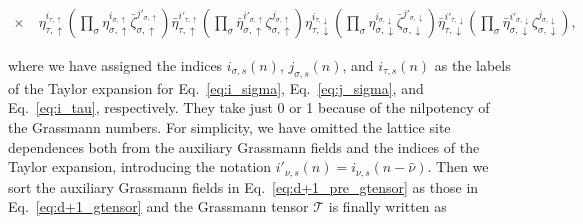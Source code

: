 \documentclass[nofootinbib,prd,aps,superscriptaddress,preprintnumbers,twocolumn,showpacs]{revtex4-1}
\begin{document}
\begin{widetext}
\begin{align}
	\times&~\eta_{\tau,\uparrow}^{i_{\tau,\uparrow}}\left(\prod_{\sigma}\eta_{\sigma,\uparrow}^{i_{\sigma,\uparrow}}\bar{\zeta}_{\sigma,\uparrow}^{j'_{\sigma,\uparrow}}\right)\bar{\eta}_{\tau,\uparrow}^{i'_{\tau,\uparrow}}\left(\prod_{\sigma}\bar{\eta}_{\sigma,\uparrow}^{i'_{\sigma,\uparrow}}\zeta_{\sigma,\uparrow}^{j_{\sigma,\uparrow}}\right)
	\eta_{\tau,\downarrow}^{i_{\tau,\downarrow}}\left(\prod_{\sigma}\eta_{\sigma,\downarrow}^{i_{\sigma,\downarrow}}\bar{\zeta}_{\sigma,\downarrow}^{j'_{\sigma,\downarrow}}\right)\bar{\eta}_{\tau,\downarrow}^{i'_{\tau,\downarrow}}\left(\prod_{\sigma}\bar{\eta}_{\sigma,\downarrow}^{i'_{\sigma,\downarrow}}\zeta_{\sigma,\downarrow}^{j_{\sigma,\downarrow}}\right),
\end{align}
\end{widetext}
where we have assigned the indices $i_{\sigma,s}(n)$, $j_{\sigma,s}(n)$, and $i_{\tau,s}(n)$ as the labels of the Taylor expansion for Eq.~\eqref{eq:i_sigma}, Eq.~\eqref{eq:j_sigma}, and Eq.~\eqref{eq:i_tau}, respectively. They take just 0 or 1 because of the nilpotency of the Grassmann numbers. For simplicity, we have omitted the lattice site dependences both from the auxiliary Grassmann fields and the indices of the Taylor expansion, introducing the notation $i'_{\nu,s}(n)=i_{\nu,s}(n-\hat{\nu})$. Then we sort the auxiliary Grassmann fields in Eq.~\eqref{eq:d+1_pre_gtensor} as those in Eq.~\eqref{eq:d+1_gtensor} and the Grassmann tensor $\mathcal{T}$ is finally written as
\end{document}
